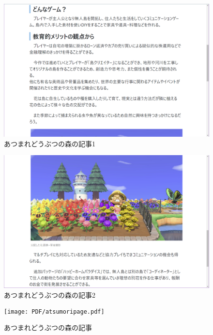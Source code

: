 \documentclass[12pt,a4j,titlepage]{ltjsarticle}
\begin{document}
\vspace{1zh}
\begin{figure}[H]
\begin{center}
 \includegraphics[keepaspectratio, scale=0.35]{PDF/あつ森1.pdf}
\end{center}
 \caption{あつまれどうぶつの森の記事1}
 \label{fig:あつ森1}
\end{figure}

\vspace{1zh}
\begin{figure}[H]
\begin{center}
 \includegraphics[keepaspectratio, scale=0.35]{PDF/あつ森2.pdf}
\end{center}
 \caption{あつまれどうぶつの森の記事2}
 \label{fig:あつ森2}
\end{figure}

\begin{figure}[H]
\begin{center}
 \texttt{[image: PDF/atsumoripage.pdf]}
\end{center}
 \caption{あつまれどうぶつの森の記事}
 \label{fig:あつ森2}
\end{figure}
\end{document}
